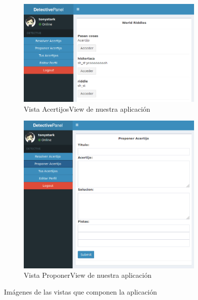 \begin{figure}[hbtp] \centering
\begin{subfigure}{.8\textwidth}
    \includegraphics[width=\linewidth]{figuras/riddling.png}
    \caption{Vista AcertijosView de nuestra aplicación}
    \label{fig::acertijosview}
\end{subfigure}
\begin{subfigure}{.8\textwidth}
    \includegraphics[width=\linewidth]{figuras/proponerview.png}
    \caption{Vista ProponerView de nuestra aplicación}
    \label{fig::proponerview}
\end{subfigure}
\caption{Imágenes de las vistas que componen la aplicación}
\end{figure}

